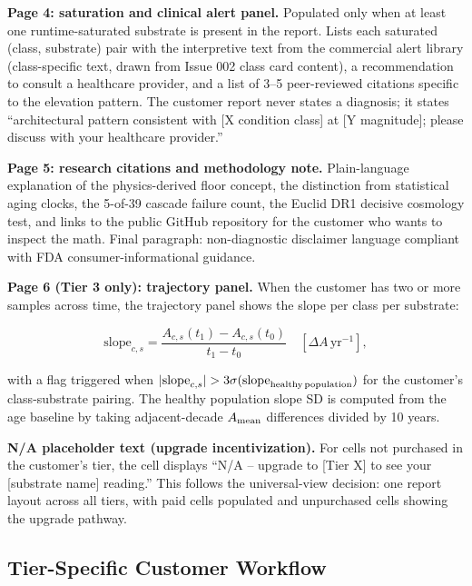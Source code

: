 \documentclass[12pt,a4paper]{article}
\begin{document}
\textbf{Page 4: saturation and clinical alert panel.} Populated only
when at least one runtime-saturated substrate is present in the
report. Lists each saturated (class, substrate) pair with the
interpretive text from the commercial alert library (class-specific
text, drawn from Issue 002 class card content), a recommendation
to consult a healthcare provider, and a list of 3--5 peer-reviewed
citations specific to the elevation pattern. The customer report
never states a diagnosis; it states ``architectural pattern
consistent with [X condition class] at [Y magnitude]; please
discuss with your healthcare provider.''

\textbf{Page 5: research citations and methodology note.} Plain-language
explanation of the physics-derived floor concept, the distinction from
statistical aging clocks, the 5-of-39 cascade failure count, the
Euclid DR1 decisive cosmology test, and links to the public
GitHub repository for the customer who wants to inspect the math.
Final paragraph: non-diagnostic disclaimer language compliant with
FDA consumer-informational guidance.

\textbf{Page 6 (Tier 3 only): trajectory panel.} When the customer
has two or more samples across time, the trajectory panel shows
the slope per class per substrate:

\begin{equation}
\mathrm{slope}_{c,s} = \frac{A_{c,s}(t_1) - A_{c,s}(t_0)}{t_1 - t_0} \quad [\Delta A\, \mathrm{yr}^{-1}],
\label{eq:trajectory_slope}
\end{equation}

with a flag triggered when
$|\mathrm{slope}_{c,s}| > 3 \sigma(\mathrm{slope}_{\rm healthy\, population})$
for the customer's class-substrate pairing. The healthy population
slope SD is computed from the age baseline by taking adjacent-decade
$A_{\rm mean}$ differences divided by 10 years.

\textbf{N/A placeholder text (upgrade incentivization).} For cells not
purchased in the customer's tier, the cell displays ``N/A -- upgrade
to [Tier X] to see your [substrate name] reading.'' This follows the
universal-view decision: one report layout across all tiers, with
paid cells populated and unpurchased cells showing the upgrade
pathway.

\subsection{Tier-Specific Customer Workflow}
\label{subsec:tier_workflow}
\end{document}
